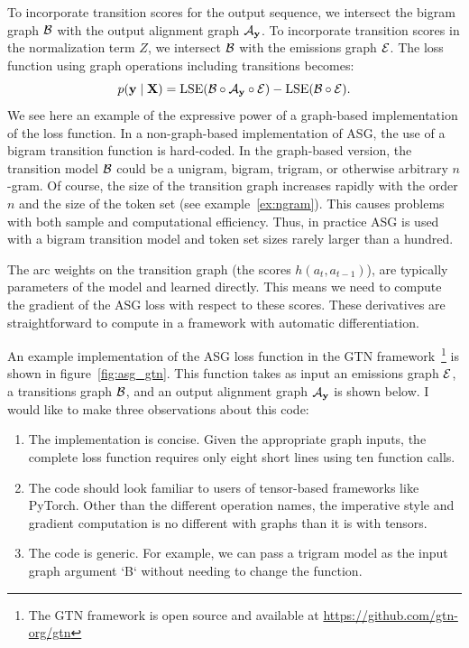 To incorporate transition scores for the output sequence, we intersect the
bigram graph $\mathcal{B}$ with the output alignment graph $\mathcal{A}_{\bf y}$. To incorporate
transition scores in the normalization term $Z$, we intersect $\mathcal{B}$ with the
emissions graph $\mathcal{E}$. The loss function using graph operations including
transitions becomes:
$$
p({\bf y} \mid {\bf X}) = \operatorname*{\textrm{LSE}}(\mathcal{B} \circ \mathcal{A}_{\bf y} \circ \mathcal{E}) - \operatorname*{\textrm{LSE}}(\mathcal{B} \circ \mathcal{E}).
$$
We see here an example of the expressive power of a graph-based implementation
of the loss function. In a non-graph-based implementation of ASG, the use of a
bigram transition function is hard-coded. In the graph-based version, the
transition model $\mathcal{B}$ could be a unigram, bigram, trigram, or otherwise
arbitrary $n$-gram. Of course, the size of the transition graph increases
rapidly with the order $n$ and the size of the token set (see
example~\ref{ex:ngram}). This causes problems with both sample and
computational efficiency. Thus, in practice ASG is used with a bigram
transition model and token set sizes rarely larger than a hundred.

The arc weights on the transition graph (the scores $h(a_t, a_{t-1})$), are
typically parameters of the model and learned directly. This means we need to
compute the gradient of the ASG loss with respect to these scores. These
derivatives are straightforward to compute in a framework with automatic
differentiation.



An example implementation of the ASG loss function in the GTN
framework~\footnote{The GTN framework is open source and available at
\url{https://github.com/gtn-org/gtn}} is shown in figure~\ref{fig:asg_gtn}.
This function takes as input an emissions graph $\mathcal{E}$, a transitions graph
$\mathcal{B}$, and an output alignment graph $\mathcal{A}_{\bf y}$ is shown below. I would like to
make three observations about this code:

\begin{enumerate}
    \item The implementation is concise. Given the appropriate graph inputs,
        the complete loss function requires only eight short lines using ten
        function calls.

    \item The code should look familiar to users of tensor-based frameworks
        like PyTorch. Other than the different operation names, the imperative
        style and gradient computation is no different with graphs than it is
        with tensors.

    \item The code is generic. For example, we can pass a trigram model as the
        input graph argument `B` without needing to change the function.
\end{enumerate}

